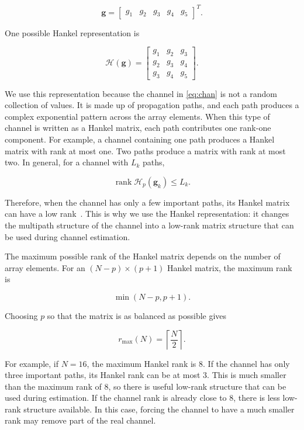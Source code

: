 \documentclass[journal]{IEEEtran}
\DeclareMathOperator{\rank}{rank}
\newcommand{\bg}{\mathbf{g}}
\newcommand{\Hank}{\mathcal{H}}
\newcommand{\rmax}{r_{\max}}
\begin{document}
\begin{equation}
\bg=
\begin{bmatrix}
g_1 & g_2 & g_3 & g_4 & g_5
\end{bmatrix}^{T}.
\end{equation}

One possible Hankel representation is

\begin{equation}
\Hank(\bg)
=
\begin{bmatrix}
g_1 & g_2 & g_3\\
g_2 & g_3 & g_4\\
g_3 & g_4 & g_5
\end{bmatrix}.
\end{equation}

We use this representation because the channel in \eqref{eq:chan} is not
a random collection of values. It is made up of propagation paths, and
each path produces a complex exponential pattern across the array elements.
When this type of channel is written as a Hankel matrix, each path
contributes one rank-one component. For example, a channel containing one
path produces a Hankel matrix with rank at most one. Two paths produce a
matrix with rank at most two. In general, for a channel with $L_k$ paths,

\begin{equation}
\rank\Hank_p(\bg_k)
\leq
L_k.
\end{equation}

Therefore, when the channel has only a few important paths, its Hankel
matrix can have a low rank~\cite{cadzow1988,markovsky2008}. This is why we
use the Hankel representation: it changes the multipath structure of the
channel into a low-rank matrix structure that can be used during channel
estimation.

The maximum possible rank of the Hankel matrix depends on the number of
array elements. For an $(N-p)\times(p+1)$ Hankel matrix, the maximum rank is

\begin{equation}
\min(N-p,p+1).
\end{equation}

Choosing $p$ so that the matrix is as balanced as possible gives

\begin{equation}
\rmax(N)
=
\left\lceil
\frac{N}{2}
\right\rceil.
\label{eq:cap}
\end{equation}

For example, if $N=16$, the maximum Hankel rank is $8$. If the channel
has only three important paths, its Hankel rank can be at most $3$.
This is much smaller than the maximum rank of $8$, so there is useful
low-rank structure that can be used during estimation. If the channel
rank is already close to $8$, there is less low-rank structure available.
In this case, forcing the channel to have a much smaller rank may remove
part of the real channel.
\end{document}

